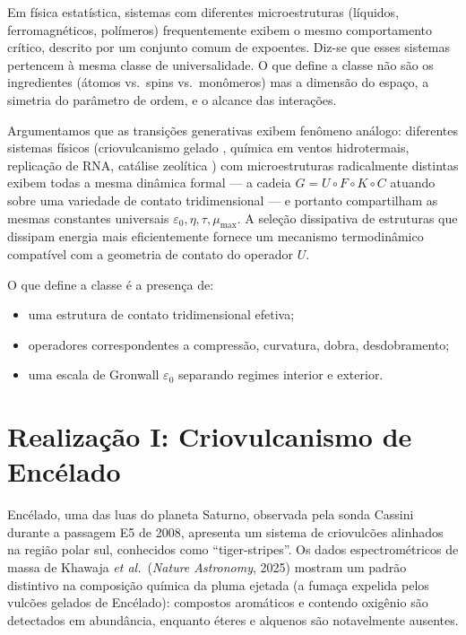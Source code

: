 \documentclass[12pt,a4paper,twoside]{book}
\theoremstyle{plain}
\theoremstyle{definition}
\theoremstyle{definition}
\newcommand{\epsz}{\varepsilon_{0}}
\newcommand{\tribo}{\eta}
\begin{document}
Em física estatística, sistemas com diferentes microestruturas (líquidos,
ferromagnéticos, polímeros) frequentemente exibem o mesmo comportamento
crítico, descrito por um conjunto comum de expoentes. Diz-se que esses
sistemas pertencem à mesma classe de universalidade. O que define a
classe não são os ingredientes (átomos vs.\ spins vs.\ monômeros) mas a
dimensão do espaço, a simetria do parâmetro de ordem, e o alcance das
interações.

Argumentamos que as transições generativas exibem fenômeno análogo:
diferentes sistemas físicos (criovulcanismo gelado \cite{GrossiEnceladus},
química em ventos hidrotermais, replicação de RNA, catálise zeolítica
\cite{GrossiCatalise}) com microestruturas radicalmente distintas exibem
todas a mesma dinâmica formal --- a cadeia $G = U \circ F \circ K \circ C$
atuando sobre uma variedade de contato tridimensional --- e portanto
compartilham as mesmas constantes universais $\epsz, \tribo, \tau,
\mu_{\max}$. A seleção dissipativa de estruturas que dissipam energia mais
eficientemente \cite{England} fornece um mecanismo termodinâmico compatível
com a geometria de contato do operador $U$.

O que define a classe é a presença de:
\begin{itemize}
  \item uma estrutura de contato tridimensional efetiva;
  \item operadores correspondentes a compressão, curvatura, dobra,
        desdobramento;
  \item uma escala de Gronwall $\epsz$ separando regimes interior e
        exterior.
\end{itemize}

\section{Realização I: Criovulcanismo de Encélado}
\label{sec:enceladus}

Encélado, uma das luas do planeta Saturno, observada pela sonda Cassini durante
a passagem E5 de 2008, apresenta um sistema de criovulcões alinhados na região
polar sul, conhecidos como ``tiger-stripes''. Os dados espectrométricos
de massa de Khawaja \emph{et al.}\ (\emph{Nature Astronomy}, 2025)
mostram um padrão distintivo na composição química da pluma ejetada
(a fumaça expelida pelos vulcões gelados de Encélado):
compostos aromáticos e contendo oxigênio são detectados em abundância,
enquanto éteres e alquenos são notavelmente ausentes.
\end{document}
